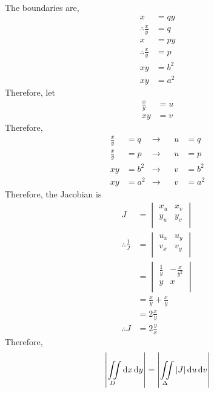 \documentclass[fleqn, a4paper, 11pt, oneside]{amsart}
\theoremstyle{definition}
\theoremstyle{theorem}
\begin{document}
\begin{solution}
	The boundaries are,
	\begin{align*}
		x                      & = q y \\
		\therefore \frac{x}{y} & = q   \\
		x                      & = p y \\
		\therefore \frac{x}{y} & = p   \\
		x y                    & = b^2 \\
		x y                    & = a^2
	\end{align*}
	Therefore, let
	\begin{align*}
		\frac{x}{y} & = u \\
		x y         & = v
	\end{align*}
	Therefore,
	\begin{align*}
		\frac{x}{y} & = q   & \to &  & u & = q   \\
		\frac{x}{y} & = p   & \to &  & u & = p   \\
		x y         & = b^2 & \to &  & v & = b^2 \\
		x y         & = a^2 & \to &  & v & = a^2
	\end{align*}
	Therefore, the Jacobian is
	\begin{align*}
		J &=
			\begin{vmatrix}
				x_u & x_v \\
				y_u & y_v \\
			\end{vmatrix}\\
		\therefore \frac{1}{J} &=
			\begin{vmatrix}
				u_x & u_y \\
				v_x & v_y \\
			\end{vmatrix}\\
		&=
			\begin{vmatrix}
				\frac{1}{y} & -\frac{x}{y^2} \\
				y           & x              \\
			\end{vmatrix}\\
		&= \frac{x}{y} + \frac{x}{y}\\
		&= 2 \frac{x}{y}\\
		\therefore J &= 2 \frac{y}{x}
	\end{align*}
	Therefore,
	\begin{align*}
		\left| \iint\limits_{D} \dif x \dif y \right| & = \left| \iint\limits_{\Delta} |J| \dif u \dif v \right|                                                \\

\end{align*}
\end{solution}
\end{document}

